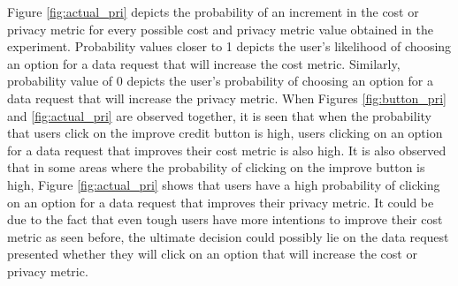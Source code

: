 Figure \ref{fig:actual_pri} depicts the probability of an increment in the cost or privacy metric for every possible cost and privacy metric value obtained in the experiment. Probability values closer to 1 depicts the user's likelihood of choosing an option for a data request that will increase the cost metric. Similarly, probability value of 0 depicts the user's probability of choosing an option for a data request that will increase the privacy metric. When Figures \ref{fig:button_pri} and \ref{fig:actual_pri} are observed together, it is seen that when the probability that users click on the improve credit button is high, users clicking on an option for a data request that improves their cost metric is also high. It is also observed that in some areas where the probability of clicking on the improve button is high, Figure \ref{fig:actual_pri} shows that users have a high probability of clicking on an option for a data request that improves their privacy metric. It could be due to the fact that even tough users have more intentions to improve their cost metric as seen before, the ultimate decision could possibly lie on the data request presented whether they will click on an option that will increase the cost or privacy metric.

%
%

